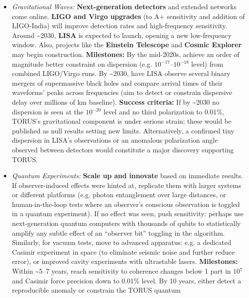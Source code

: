 \documentclass[]{article}
\newcommand{\superscript}[1]{\ensuremath{^{\mathrm{#1}}}}
\begin{document}
\begin{itemize}
  \begin{itemize}
  \item
    \emph{Gravitational Waves:} \textbf{Next-generation detectors} and
    extended networks come online. \textbf{LIGO and Virgo upgrades} (to
    A+ sensitivity and addition of LIGO-India) will improve detection
    rates and high-frequency sensitivity. Around \textasciitilde{}2030,
    \textbf{LISA} is expected to launch, opening a new low-frequency
    window. Also, projects like the \textbf{Einstein Telescope} and
    \textbf{Cosmic Explorer} may begin construction.
    \textbf{Milestones:} By the mid-2020s, achieve an order of magnitude
    better constraint on dispersion (e.g.
    $10\superscript{−17}$--$10\superscript{−18}$ level) from combined LIGO/Virgo
    runs. By \textasciitilde{}2030, have LISA observe several binary
    mergers of supermassive black holes and compare arrival times of
    their waveforms' peaks across frequencies (aim to detect or
    constrain dispersive delay over millions of km baseline).
    \textbf{Success criteria:} If by \textasciitilde{}2030 no dispersion
    is seen at the $10\superscript{−20}$ level and no third polarization to
    0.01\%, TORUS's gravitational component is under serious strain;
    these would be published as null results setting new limits​.
    Alternatively, a confirmed tiny dispersion in LISA's observations or
    an anomalous polarization angle observed between detectors would
    constitute a major discovery supporting TORUS.
  \item
    \emph{Quantum Experiments:} \textbf{Scale up and innovate} based on
    immediate results. If observer-induced effects were hinted at,
    replicate them with larger systems or different platforms (e.g.
    photon entanglement over large distances, or human-in-the-loop tests
    where an observer's conscious observation is toggled in a quantum
    experiment). If no effect was seen, push sensitivity: perhaps use
    next-generation quantum computers with thousands of qubits to
    statistically amplify any subtle effect of an ``observer bit''
    toggling in the algorithm. Similarly, for vacuum tests, move to
    advanced apparatus: e.g. a dedicated Casimir experiment in space (to
    eliminate seismic noise and further reduce error), or improved
    cavity experiments with ultrastable lasers. \textbf{Milestones:}
    Within \textasciitilde{}5--7 years, reach sensitivity to coherence
    changes below 1 part in
    $10\superscript{7}$ and
    Casimir force precision down to 0.01\% level. By 10 years, either
    detect a reproducible anomaly or constrain the TORUS quantum

\end{itemize}
\end{itemize}
\end{document}
